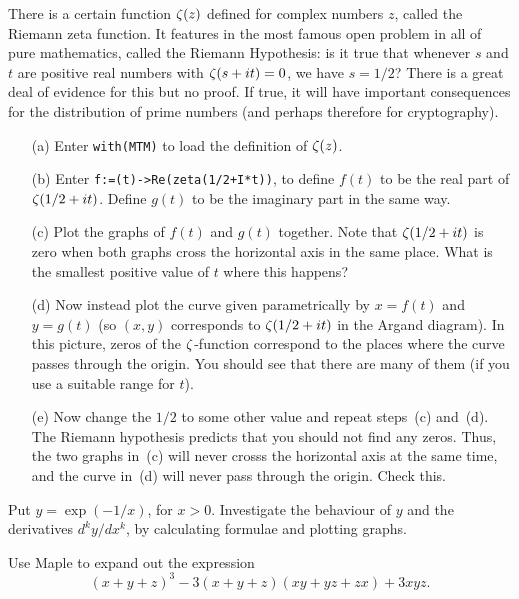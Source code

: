 \documentclass[a4paper,10pt]{amsbook}
\numberwithin{example}{chapter}
\begin{document}
\begin{exercise}
 There is a certain function $\zeta(z)$ defined for complex numbers $z$,
 called the Riemann zeta function.  It features in the most famous
 open problem in all of pure mathematics, called the Riemann
 Hypothesis: is it true that whenever $s$ and $t$ are positive real
 numbers with $\zeta(s+it)=0$, we have $s=1/2$?  There is a great deal
 of evidence for this but no proof.  If true, it will have important
 consequences for the distribution of prime numbers (and perhaps
 therefore for cryptography).

 \begin{itemize}
  \item[(a)] Enter \verb~with(MTM)~ to load the definition of
   $\zeta(z)$.
  \item[(b)] Enter \verb~f:=(t)->Re(zeta(1/2+I*t))~, to
   define $f(t)$ to be the real part of $\zeta(1/2+it)$.  Define $g(t)$ to
   be the imaginary part in the same way.
  \item[(c)] Plot the graphs of $f(t)$ and $g(t)$ together.  Note that
   $\zeta(1/2+it)$ is zero when both graphs cross the horizontal axis in
   the same place.  What is the smallest positive value of $t$ where
   this happens?
  \item[(d)] Now instead plot the curve given parametrically by
   $x=f(t)$ and $y=g(t)$ (so $(x,y)$ corresponds to $\zeta(1/2+it)$ in
   the Argand diagram).  In this picture, zeros of the $\zeta$-function
   correspond to the places where the curve passes through the
   origin.  You should see that there are many of them (if you use a
   suitable range for $t$).
  \item[(e)] Now change the $1/2$ to some other value and repeat
   steps~(c) and~(d).  The Riemann hypothesis predicts that you should
   not find any zeros.  Thus, the two graphs in~(c) will never crosss
   the horizontal axis at the same time, and the curve in~(d) will
   never pass through the origin.  Check this.
 \end{itemize}
\end{exercise}

\begin{exercise}
 Put $y=\exp(-1/x)$, for $x>0$.  Investigate the behaviour of $y$ and
 the derivatives $d^ky/dx^k$, by calculating formulae and plotting
 graphs.  
\end{exercise}

\begin{exercise}\label{ex-expand-symmetric}
 Use Maple to expand out the expression
 \[ (x+y+z)^3 - 3(x+y+z)(xy+yz+zx) + 3xyz. \]
\end{exercise}
\end{document}
